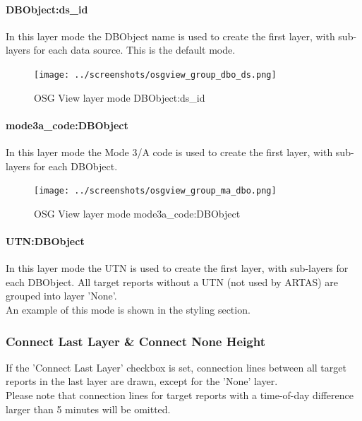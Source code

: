 \paragraph{DBObject:ds\_id}

In this layer mode the DBObject name is used to create the first layer, with sub-layers for each data source. This is the default mode.

\begin{figure}[H]
    \center
    \texttt{[image: ../screenshots/osgview\_group\_dbo\_ds.png]}
  \caption{OSG View layer mode DBObject:ds\_id}
\end{figure}

\paragraph{mode3a\_code:DBObject}

In this layer mode the Mode 3/A code is used to create the first layer, with sub-layers for each DBObject.

\begin{figure}[H]
\center
    \texttt{[image: ../screenshots/osgview\_group\_ma\_dbo.png]}
  \caption{OSG View layer mode mode3a\_code:DBObject}
\end{figure}

\paragraph{UTN:DBObject}

In this layer mode the UTN is used to create the first layer, with sub-layers for each DBObject. All target reports without a UTN (not used by ARTAS) are grouped into layer 'None'.  \\

An example of this mode is shown in the styling section.


\subsubsection{Connect Last Layer \& Connect None Height}

If the 'Connect Last Layer' checkbox is set, connection lines between all target reports in the last layer are drawn, except for the 'None' layer. \\

Please note that connection lines for target reports with a time-of-day difference larger than 5 minutes will be omitted. \\

